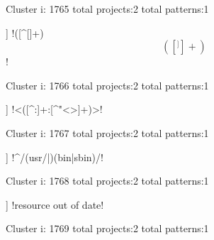 Cluster i: 1765
total projects:2
total patterns:1
\begin{multicols}{1}
\begin{description}[noitemsep,topsep=0pt]
\item [[2] ] \cverb!([^[]+)\[([^]]+)\]!
\end{description}
\end{multicols}







Cluster i: 1766
total projects:2
total patterns:1
\begin{multicols}{1}
\begin{description}[noitemsep,topsep=0pt]
\item [[2] ] \cverb!<([^:]+:[^\s"<>]+)>!
\end{description}
\end{multicols}







Cluster i: 1767
total projects:2
total patterns:1
\begin{multicols}{1}
\begin{description}[noitemsep,topsep=0pt]
\item [[2] ] \cverb!^/(usr/|)(bin|sbin)/!
\end{description}
\end{multicols}







Cluster i: 1768
total projects:2
total patterns:1
\begin{multicols}{1}
\begin{description}[noitemsep,topsep=0pt]
\item [[2] ] \cverb!resource out of date!
\end{description}
\end{multicols}







Cluster i: 1769
total projects:2
total patterns:1
\begin{multicols}{1}
\end{multicols}







